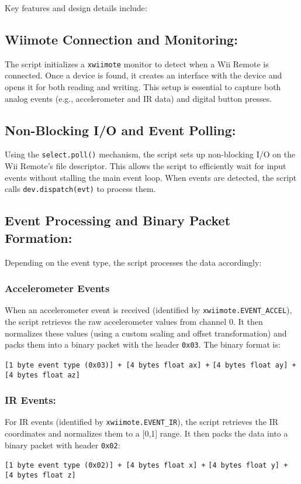 Key features and design details include:

\subsection*{Wiimote Connection and Monitoring:}
The script initializes a \texttt{xwiimote} monitor to detect when a Wii Remote is connected. Once a device is found, it creates an interface with the device and opens it for both reading and writing. This setup is essential to capture both analog events (e.g., accelerometer and IR data) and digital button presses.

\subsection*{Non-Blocking I/O and Event Polling:}
Using the \texttt{select.poll()} mechanism, the script sets up non-blocking I/O on the Wii Remote’s file descriptor. This allows the script to efficiently wait for input events without stalling the main event loop. When events are detected, the script calls \texttt{dev.dispatch(evt)} to process them.

\subsection*{Event Processing and Binary Packet Formation:}
Depending on the event type, the script processes the data accordingly:
\subsubsection*{Accelerometer Events}
When an accelerometer event is received (identified by \texttt{xwiimote.EVENT\_ACCEL}), the script retrieves the raw accelerometer values from channel 0. It then normalizes these values (using a custom scaling and offset transformation) and packs them into a binary packet with the header \texttt{0x03}. The binary format is:
\begin{center}
	\texttt{[1 byte event type (0x03)] + [4 bytes float ax] +}
	\texttt{[4 bytes float ay] + [4 bytes float az]}
\end{center}
\subsubsection*{IR Events:}
For IR events (identified by \texttt{xwiimote.EVENT\_IR}), the script retrieves the IR coordinates and normalizes them to a [0,1] range. It then packs the data into a binary packet with header \texttt{0x02}:
\begin{center}
	\texttt{[1 byte event type (0x02)] + [4 bytes float x] +}
	\texttt{[4 bytes float y] + [4 bytes float z]}
\end{center}
